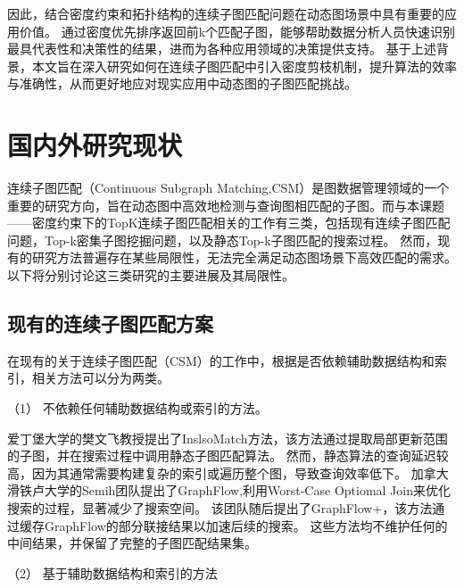 因此，结合密度约束和拓扑结构的连续子图匹配问题在动态图场景中具有重要的应用价值。
通过密度优先排序返回前k个匹配子图，能够帮助数据分析人员快速识别最具代表性和决策性的结果，进而为各种应用领域的决策提供支持。
基于上述背景，本文旨在深入研究如何在连续子图匹配中引入密度剪枝机制，提升算法的效率与准确性，从而更好地应对现实应用中动态图的子图匹配挑战。
\section{国内外研究现状}
连续子图匹配（Continuous Subgraph Matching,CSM）是图数据管理领域的一个重要的研究方向，旨在动态图中高效地检测与查询图相匹配的子图。而与本课题——密度约束下的TopK连续子图匹配相关的工作有三类，包括现有连续子图匹配问题，Top-k密集子图挖掘问题，以及静态Top-k子图匹配的搜索过程。
然而，现有的研究方法普遍存在某些局限性，无法完全满足动态图场景下高效匹配的需求。以下将分别讨论这三类研究的主要进展及其局限性。
\subsection{现有的连续子图匹配方案}
在现有的关于连续子图匹配（CSM）的工作\cite{csm-sjtree-DBLP:conf/edbt/ChoudhuryHCAF15,csm-IncIsoMatch-DBLP:conf/sigmod/FanLLTWW11,csm-graphflow-DBLP:conf/sigmod/KankanamgeSMCS17,csm-turboflux-DBLP:conf/sigmod/KimSHLHCSJ18,csm-graphflowpp-DBLP:journals/tods/MhedhbiKS21,csm-symbi-DBLP:journals/pvldb/MinPPGIH21,csm-rapidflow-DBLP:journals/pvldb/SunSHL22}中，根据是否依赖辅助数据结构和索引，相关方法可以分为两类。

（1） 不依赖任何辅助数据结构或索引的方法。

爱丁堡大学的樊文飞教授提出了InslsoMatch\cite{csm-IncIsoMatch-DBLP:conf/sigmod/FanLLTWW11}方法，该方法通过提取局部更新范围的子图，并在搜索过程中调用静态子图匹配算法。
然而，静态算法的查询延迟较高，因为其通常需要构建复杂的索引或遍历整个图，导致查询效率低下。
加拿大滑铁卢大学的Semih团队提出了GraphFlow\cite{csm-graphflow-DBLP:conf/sigmod/KankanamgeSMCS17},利用Worst-Case Optiomal Join来优化搜索的过程，显著减少了搜索空间。
该团队随后提出了GraphFlow+\cite{csm-graphflowpp-DBLP:journals/tods/MhedhbiKS21}，该方法通过缓存GraphFlow的部分联接结果以加速后续的搜索。
这些方法均不维护任何的中间结果，并保留了完整的子图匹配结果集。

（2） 基于辅助数据结构和索引的方法

